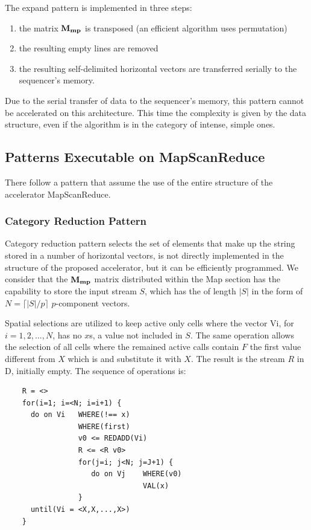 The expand  pattern is implemented in three steps:
\begin{enumerate}
    \item the matrix ${\bf M_{mp}}$ is transposed (an efficient algorithm uses permutation)
    \item the resulting empty lines are removed
    \item the resulting self-delimited horizontal vectors are transferred serially to the sequencer's memory.
\end{enumerate}

Due to the serial transfer of data to the sequencer's memory, this pattern cannot be accelerated on this architecture. This time the complexity is given by the data structure, even if the algorithm is in the category of intense, simple ones.


\subsection{Patterns Executable on MapScanReduce}

There follow  a pattern that assume the use of the entire structure of the accelerator MapScanReduce.

\subsubsection{Category Reduction Pattern}

Category reduction pattern selects the set of elements that make up the string stored in a number of horizontal vectors,  is not directly implemented in the structure of the proposed accelerator, but it can be efficiently programmed. We consider that  the ${\bf M_{mp}}$ matrix distributed within the Map section has the capability to store the input stream $S$, which has the  of length $|S|$ in the form of  $N = \lceil |S|/p \rceil$ $p$-component vectors.

Spatial selections are utilized to keep active only cells where the vector Vi, for $i = 1, 2, ...,N$, has no $x$s, a value not included in $S$.  The same operation allows the selection of all cells where the remained active calls contain $F$ the first value different from $X$ which is and substitute it with $X$. The result is the stream $R$ in D, initially empty. The sequence of operations is:
\begin{verbatim}
    R = <>
    for(i=1; i=<N; i=i+1) {
      do on Vi   WHERE(!== x)
                 WHERE(first)
                 v0 <= REDADD(Vi)
                 R <= <R v0>
                 for(j=i; j<N; j=J+1) {
                    do on Vj    WHERE(v0)
                                VAL(x)     
                 }
      until(Vi = <X,X,...,X>)              
    }
\end{verbatim}


